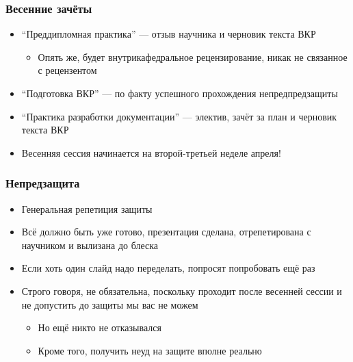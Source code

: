 \documentclass[xetex,mathserif,serif]{beamer}
\begin{document}
    \begin{frame}
        \frametitle{Весенние зачёты}
        \begin{itemize}
            \item ``Преддипломная практика'' --- отзыв научника и черновик текста ВКР
            \begin{itemize}
                \item Опять же, будет внутрикафедральное рецензирование, никак не связанное с рецензентом
            \end{itemize}
            \item ``Подготовка ВКР'' --- по факту успешного прохождения непредпредзащиты
            \item ``Практика разработки документации'' --- электив, зачёт за план и черновик текста ВКР
            \item Весенняя сессия начинается на второй-третьей неделе апреля!
        \end{itemize}
    \end{frame}

    \begin{frame}
        \frametitle{Непредзащита}
        \begin{itemize}
            \item Генеральная репетиция защиты
            \item Всё должно быть уже готово, презентация сделана, отрепетирована с научником и вылизана до блеска
            \item Если хоть один слайд надо переделать, попросят попробовать ещё раз
            \item Строго говоря, не обязательна, поскольку проходит после весенней сессии и не допустить до защиты мы вас не можем
            \begin{itemize}
                \item Но ещё никто не отказывался
                \item Кроме того, получить неуд на защите вполне реально
            \end{itemize}
        \end{itemize}
    \end{frame}
\end{document}
